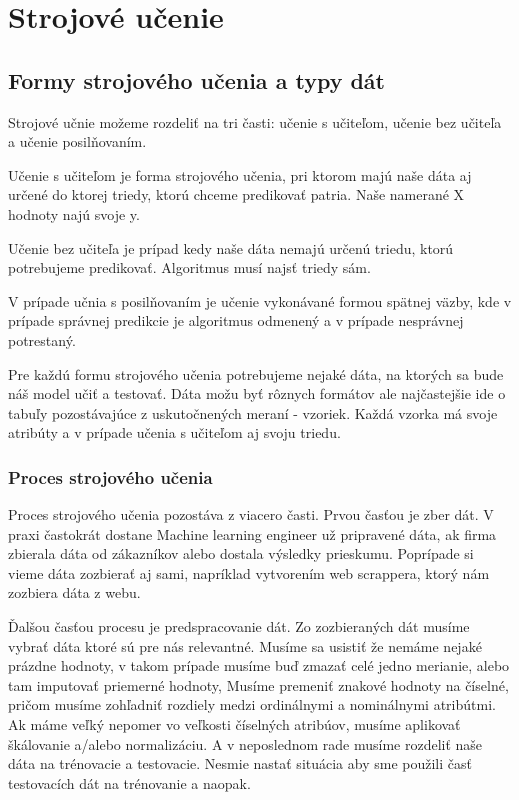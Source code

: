 
\chapter{Strojové učenie}

\section{Formy strojového učenia a typy dát}
Strojové učnie možeme rozdeliť na tri časti: učenie s učiteľom, učenie bez učiteľa a učenie posilňovaním.

Učenie s učiteľom je forma strojového učenia, pri ktorom majú naše dáta aj určené do ktorej triedy, ktorú chceme predikovať patria. Naše namerané X hodnoty najú svoje y.

Učenie bez učiteľa je prípad kedy naše dáta nemajú určenú triedu, ktorú potrebujeme predikovať. Algoritmus musí najsť triedy sám.

V prípade učnia s posilňovaním je učenie vykonávané formou spätnej väzby, kde v prípade správnej predikcie je algoritmus odmenený a v prípade nesprávnej potrestaný. 

Pre každú formu strojového učenia potrebujeme nejaké dáta, na ktorých sa bude náš model učiť a testovať. Dáta možu byť rôznych formátov ale najčastejšie ide o tabuľy pozostávajúce z uskutočnených meraní - vzoriek. Každá vzorka má svoje atribúty a v prípade učenia s učiteľom aj svoju triedu. 

\subsection{Proces strojového učenia}
Proces strojového učenia pozostáva z viacero časti. Prvou časťou je zber dát. V praxi častokrát dostane Machine learning engineer už pripravené dáta, ak firma zbierala dáta od zákazníkov alebo dostala výsledky prieskumu. Poprípade si vieme dáta zozbierať aj sami, napríklad vytvorením web scrappera, ktorý nám zozbiera dáta z webu.

Ďalšou časťou procesu je predspracovanie dát. Zo zozbieraných dát musíme vybrať dáta ktoré sú pre nás relevantné. Musíme sa usistiť že nemáme nejaké prázdne hodnoty, v takom prípade musíme buď zmazať celé jedno merianie, alebo tam imputovať priemerné hodnoty, Musíme premeniť znakové hodnoty na číselné, pričom musíme zohľadniť rozdiely medzi ordinálnymi a nominálnymi atribútmi. Ak máme veľký nepomer vo veľkosti číselných atribúov, musíme aplikovať škálovanie a/alebo normalizáciu. A v neposlednom rade musíme rozdeliť naše dáta na trénovacie a testovacie. Nesmie nastať situácia aby sme použili časť testovacích dát na trénovanie a naopak.

